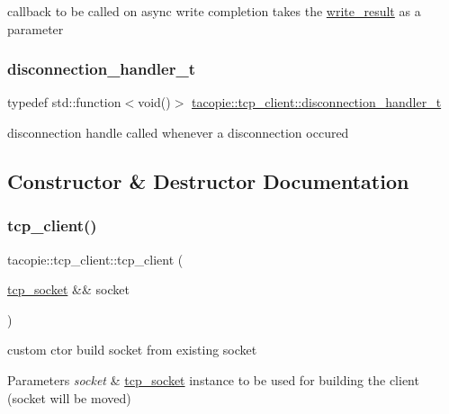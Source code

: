 callback to be called on async write completion takes the \hyperlink{structtacopie_1_1tcp__client_1_1write__result}{write\+\_\+result} as a parameter \mbox{\label{classtacopie_1_1tcp__client_aca5df52e5ee6fa673cf212532ada1453}} 
\subsubsection{\texorpdfstring{disconnection\+\_\+handler\+\_\+t}{disconnection\_handler\_t}}
{\footnotesize\ttfamily typedef std\+::function$<$void()$>$ \hyperlink{classtacopie_1_1tcp__client_aca5df52e5ee6fa673cf212532ada1453}{tacopie\+::tcp\+\_\+client\+::disconnection\+\_\+handler\+\_\+t}}

disconnection handle called whenever a disconnection occured 

\subsection{Constructor \& Destructor Documentation}
\mbox{\label{classtacopie_1_1tcp__client_a773fbcbb5b79324c8d065e363de73282}} 
\subsubsection{\texorpdfstring{tcp\+\_\+client()}{tcp\_client()}}
{\footnotesize\ttfamily tacopie\+::tcp\+\_\+client\+::tcp\+\_\+client (\begin{DoxyParamCaption}\item[{\hyperlink{classtacopie_1_1tcp__socket}{tcp\+\_\+socket} \&\&}]{socket }\end{DoxyParamCaption})\hspace{0.3cm}{\ttfamily [explicit]}}

custom ctor build socket from existing socket


\begin{DoxyParams}{Parameters}
{\em socket} & \hyperlink{classtacopie_1_1tcp__socket}{tcp\+\_\+socket} instance to be used for building the client (socket will be moved) \\
\hline
\end{DoxyParams}


